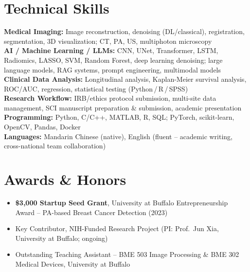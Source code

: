 \documentclass[letterpaper,10pt]{article}
\begin{document}
\section{Technical Skills}
\noindent
\small
\textbf{Medical Imaging:} Image reconstruction, denoising (DL/classical), registration, segmentation, 3D visualization; CT, PA, US, multiphoton microscopy \\
\textbf{AI / Machine Learning / LLMs:} CNN, UNet, Transformer, LSTM, Radiomics, LASSO, SVM, Random Forest, deep learning denoising; large language models, RAG systems, prompt engineering, multimodal models \\
\textbf{Clinical Data Analysis:} Longitudinal analysis, Kaplan-Meier survival analysis, ROC/AUC, regression, statistical testing (Python\,/\,R\,/\,SPSS) \\
\textbf{Research Workflow:} IRB/ethics protocol submission, multi-site data management, SCI manuscript preparation \& submission, academic presentation \\
\textbf{Programming:} Python, C/C++, MATLAB, R, SQL; PyTorch, scikit-learn, OpenCV, Pandas, Docker \\
\textbf{Languages:} Mandarin Chinese (native), English (fluent -- academic writing, cross-national team collaboration)

\vspace{-2pt}

\section{Awards \& Honors}
\begin{itemize}[leftmargin=0.2in, itemsep=1pt]
  \item \small \textbf{\$3,000 Startup Seed Grant}, University at Buffalo Entrepreneurship Award -- PA-based Breast Cancer Detection (2023)
  \item \small Key Contributor, NIH-Funded Research Project (PI: Prof.\ Jun Xia, University at Buffalo; ongoing)
  \item \small Outstanding Teaching Assistant -- BME 503 Image Processing \& BME 302 Medical Devices, University at Buffalo
\end{itemize}


\clearpage
\fontsize{11.5pt}{14pt}\selectfont
\linespread{1.08}\selectfont
\end{document}
